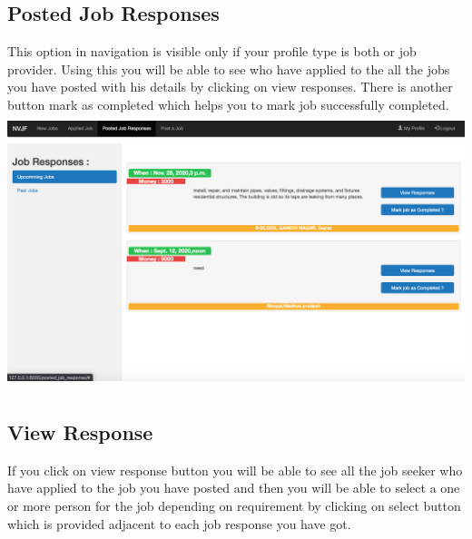 \documentclass[a4paper 12pt]{article}
\begin{document}
\subsection{Posted Job Responses}
This option in navigation is visible only if your profile type is both or job provider. Using this you will be able to see who have applied to the all the jobs you have posted with his details by clicking on view responses. There is another button mark as completed which helps you to mark job successfully completed.\\

\includegraphics[width=15cm, height=8cm]{posted job upcoming.png}

\subsection{View Response}
If you click on view response button you will be able to see all the job seeker who have applied to the job you have posted and then you will be able to select a one or more person for the job depending on requirement by clicking on select button which is provided adjacent to each job response you have got.\\
\end{document}
